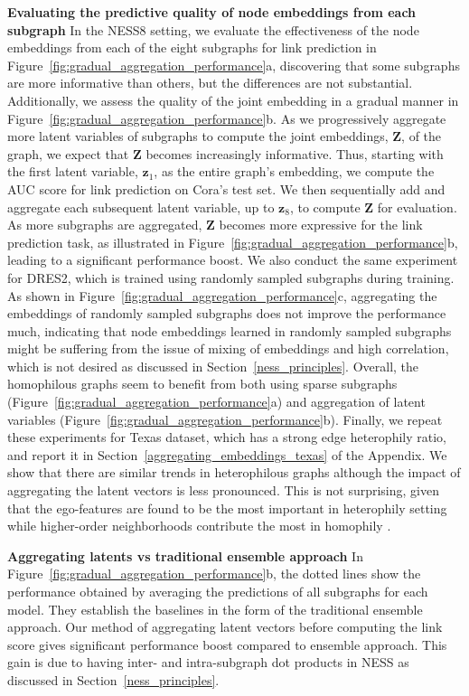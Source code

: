 \documentclass{article}
\begin{document}
\textbf{Evaluating the predictive quality of node embeddings from each subgraph} In the NESS8 setting, we evaluate the effectiveness of the node embeddings from each of the eight subgraphs for link prediction in Figure~\ref{fig:gradual_aggregation_performance}a, discovering that some subgraphs are more informative than others, but the differences are not substantial. Additionally, we assess the quality of the joint embedding in a gradual manner in Figure~\ref{fig:gradual_aggregation_performance}b. As we progressively aggregate more latent variables of subgraphs to compute the joint embeddings, $\bm Z$, of the graph, we expect that $\bm Z$ becomes increasingly informative. Thus, starting with the first latent variable, {$\pmb{z}_1$}, as the entire graph's embedding, we compute the AUC score for link prediction on Cora's test set. We then sequentially add and aggregate each subsequent latent variable, up to $\pmb{z}_8$, to compute $\pmb{Z}$ for evaluation. As more subgraphs are aggregated, $\pmb{Z}$ becomes more expressive for the link prediction task, as illustrated in Figure~\ref{fig:gradual_aggregation_performance}b, leading to a significant performance boost.
We also conduct the same experiment for DRES2, which is trained using randomly sampled subgraphs during training. As shown in Figure~\ref{fig:gradual_aggregation_performance}c, aggregating the embeddings of randomly sampled subgraphs does not improve the performance much, indicating that node embeddings learned in randomly sampled subgraphs might be suffering from the issue of mixing of embeddings and high correlation, which is not desired as discussed in Section~\ref{ness_principles}. Overall, the homophilous graphs seem to benefit from both using sparse subgraphs (Figure~\ref{fig:gradual_aggregation_performance}a) and aggregation of latent variables (Figure~\ref{fig:gradual_aggregation_performance}b). Finally, we repeat these experiments for Texas dataset, which has a strong edge heterophily ratio, and report it in Section~\ref{aggregating_embeddings_texas} of the Appendix. We show that there are similar trends in heterophilous graphs although the impact of aggregating the latent vectors is less pronounced. This is not surprising, given that the ego-features are found to be the most important in heterophily setting while higher-order neighborhoods contribute the most in homophily \citep{zhu2020beyond}.

\textbf{Aggregating latents vs traditional ensemble approach} In Figure~\ref{fig:gradual_aggregation_performance}b, the dotted lines show the performance obtained by averaging the predictions of all subgraphs for each model. They establish the baselines in the form of the traditional ensemble approach. Our method of aggregating latent vectors before computing the link score gives significant performance boost compared to ensemble approach. This gain is due to having inter- and intra-subgraph dot products in NESS as discussed in Section~\ref{ness_principles}. 
\end{document}
